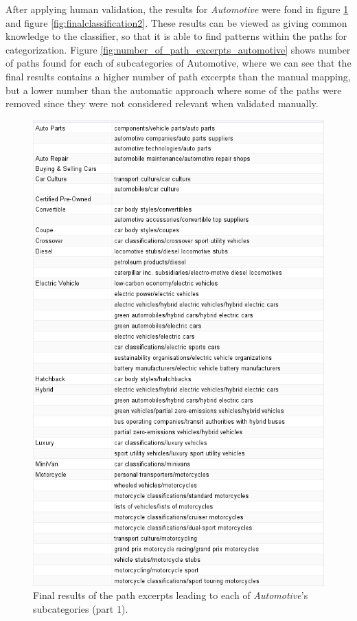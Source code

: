 After applying human validation, the results for \emph{Automotive} were fond in figure \ref{fig:finalclassification1} and figure \ref{fig:finalclassification2}. These results can be viewed as giving common knowledge  to the classifier, so that it is able to find patterns within the paths for categorization. Figure \ref{fig:number_of_path_excerpts_automotive} shows number of paths found for each of subcategories of Automotive, where we can see that the final results contains a higher number of path excerpts than the manual mapping, but a lower number than the automatic approach where some of the paths were removed since they were not considered relevant when validated manually.

\begin{figure}[h]
\centering
\includegraphics[width=\textwidth]{Chapters/Results/Final_classification_1}
\caption[Final results of mapping between path excerpts and IAB, part 1]{Final results of the path excerpts leading to each of \emph{Automotive}'s subcategories (part 1).}
\label{fig:finalclassification1}
\end{figure}


